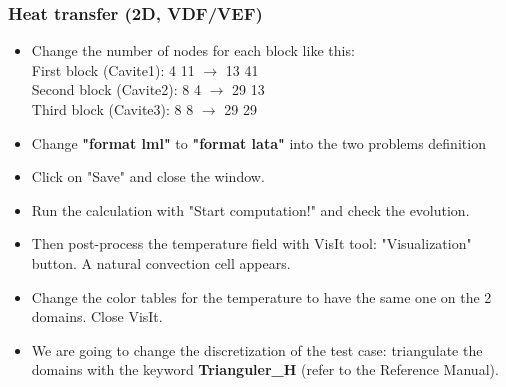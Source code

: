 \documentclass[10pt, hyperref={unicode=true,pdfusetitle, bookmarks=true,bookmarksnumbered=false,bookmarksopen=false, breaklinks=false,pdfborder={0 0l 1},backref=true,colorlinks=true,linkcolor=darkblue,pageanchor}]{beamer}
\begin{document}
\begin{frame}
\frametitle{Heat transfer (2D, VDF/VEF)}
\begin{block}{}

\begin{itemize}
\item Change the number of nodes for each block like this:\\
First block (Cavite1): 4 11 $\rightarrow$ 13 41 \\
Second block (Cavite2): 8 4 $\rightarrow$ 29 13 \\ 
Third block (Cavite3): 8 8  $\rightarrow$ 29 29 \\


\item Change \textbf{"format lml"} to \textbf{"format lata"} into the two problems definition
\item Click on "Save" and close the window.

\item Run the calculation with "Start computation!" and check the evolution.

\item Then post-process the temperature field with VisIt tool: "Visualization" button. A natural convection cell appears.

\item Change the color tables for the temperature to have the same one on the 2 domains. Close VisIt.

\item We are going to change the discretization of the test case: triangulate the domains with the keyword \textbf{Trianguler\_H} (refer to the Reference Manual).
\end{itemize}

\end{block}
\end{frame}
\end{document}
